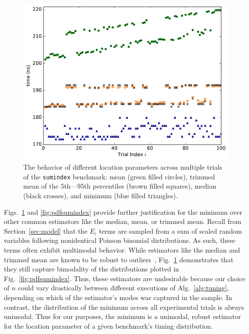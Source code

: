 \documentclass[conference]{IEEEtran}
\begin{document}
\begin{figure}
\centering
\includegraphics[width=\columnwidth]{figures/fig3/location_estimators_sumindex}
\caption{The behavior of different location parameters across multiple trials of
the \lstinline|sumindex| benchmark: mean (green filled circles), trimmed mean of
the 5th---95th percentiles (brown filled squares), median (black crosses), and
minimum (blue filled triangles).}
\label{fig:locationmeasures}
\end{figure}

Figs.~\ref{fig:locationmeasures} and \ref{fig:pdfsumindex} provide further
justification for the minimum over other common estimators like the median,
mean, or trimmed mean. Recall from Section~\ref{sec:model} that the $E_i$ terms
are sampled from a sum of scaled random variables following nonidentical
Poisson binomial distributions. As such, these terms often exhibit multimodal
behavior. While estimators like the median and trimmed mean are known to be
robust to outliers~\cite{Maronna2006}, Fig.~\ref{fig:locationmeasures}
demonstrates that they still capture bimodality of the distributions plotted in
Fig.~\ref{fig:pdfsumindex}. Thus, these estimators are undesirable because our
choice of $n$ could vary drastically between different executions of
Alg.~\ref{alg:tuning}, depending on which of the estimator's
modes was captured in the sample.  In contrast, the distribution of
the minimum across all experimental trials is always unimodal. Thus for our
purposes, the minimum is a unimodal, robust estimator for the location
parameter of a given benchmark's timing distribution.
\end{document}
